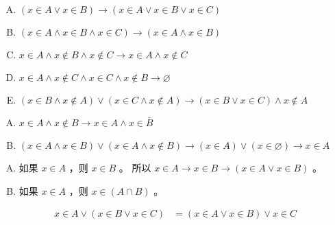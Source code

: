 {{        %
        \begin{practices}
            \begin{enumerate}[A.]
                \item $(x \in A \vee x \in B) \rightarrow (x \in A \vee x \in B \vee x \in C)$
                \item $(x \in A \wedge x \in B \wedge x \in C) \rightarrow (x \in A \wedge x \in B)$
                \item $x \in A \wedge x \notin B \wedge x \notin C \rightarrow x \in A \wedge x \notin C$
                \item $x \in A \wedge x \notin C \wedge x \in C \wedge x \notin B \rightarrow \varnothing$
                \item $(x \in B \wedge x \notin A) \vee (x \in C \wedge x \notin A) \rightarrow (x \in B \vee x \in C) \wedge x \notin A$
            \end{enumerate}
        \end{practices}

        \begin{practices}
            \begin{enumerate}[A.]
                \item $x \in A \wedge x \notin B \rightarrow x \in A \wedge x \in \bar{B}$
                \item $(x \in A \wedge x \in B) \vee (x \in A \wedge x \notin B) \rightarrow (x \in A) \vee (x \in \varnothing) \rightarrow x \in A$
            \end{enumerate}
        \end{practices}

        \begin{practices}
            \begin{enumerate}[A.]
                \item
                {
                    如果 $x \in A$ ，则 $x \in B$ 。
                    所以 $x \in A \rightarrow x \in B \rightarrow (x \in A \vee x \in B)$ 。
                }
                \item
                {
                    如果 $x \in A$ ，则 $x \in (A \cap B)$ 。
                }
            \end{enumerate}
        \end{practices}

        \begin{practices}
            \begin{align*}
                x \in A \vee (x \in B \vee x \in C)
                &= (x \in A \vee x \in B) \vee x \in C
            \end{align*}
        \end{practices}

}}
